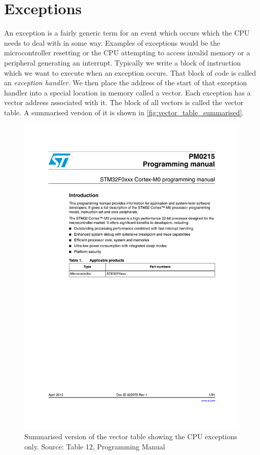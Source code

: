 \chapter{Exceptions}
An exception is a fairly generic term for an event which occurs which the CPU needs to deal with in some way. Examples of exceptions would be the microcontroller resetting or the CPU attempting to access invalid memory or a peripheral generating an interrupt. Typically we write a block of instruction which we want to execute when an exception occurs. That block of code is called an \emph{exception handler}. We then place the address of the start of that exception handler into a special location in memory called a vector. Each exception has a vector address associated with it. The block of all vectors is called the vector table. A summarised version of it is shown in \autoref{fig:vector_table_summarised}.

\begin{figure}
\centering
\includegraphics[page=23, clip=true, trim=60 476 68 168, width=\textwidth]{./stm32f0xx_programming_manual}
\caption{Summarised version of the vector table showing the CPU exceptions only. Source: Table 12, Programming Manual}
\label{fig:vector_table_summarised}
\end{figure}

